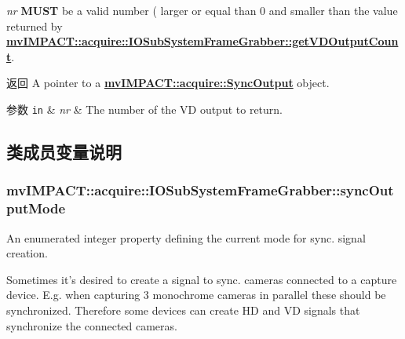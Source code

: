 {\itshape nr} {\bfseries M\+U\+S\+T} be a valid number ( larger or equal than 0 and smaller than the value returned by {\bfseries \hyperlink{classmv_i_m_p_a_c_t_1_1acquire_1_1_i_o_sub_system_frame_grabber_ac04032b336c489792fb1cc669bac3c27}{mv\+I\+M\+P\+A\+C\+T\+::acquire\+::\+I\+O\+Sub\+System\+Frame\+Grabber\+::get\+V\+D\+Output\+Count}}.

\begin{DoxyReturn}{返回}
A pointer to a {\bfseries \hyperlink{classmv_i_m_p_a_c_t_1_1acquire_1_1_sync_output}{mv\+I\+M\+P\+A\+C\+T\+::acquire\+::\+Sync\+Output}} object. 
\end{DoxyReturn}

\begin{DoxyParams}[1]{参数}
\mbox{\tt in}  & {\em nr} & The number of the V\+D output to return. \\
\hline
\end{DoxyParams}


\subsection{类成员变量说明}
\hypertarget{classmv_i_m_p_a_c_t_1_1acquire_1_1_i_o_sub_system_frame_grabber_a0e54ebc0c4382de40b6367bd7ac30288}{
\subsubsection[{sync\+Output\+Mode}]{ mv\+I\+M\+P\+A\+C\+T\+::acquire\+::\+I\+O\+Sub\+System\+Frame\+Grabber\+::sync\+Output\+Mode}}\label{classmv_i_m_p_a_c_t_1_1acquire_1_1_i_o_sub_system_frame_grabber_a0e54ebc0c4382de40b6367bd7ac30288}


An enumerated integer property defining the current mode for sync. signal creation. 

Sometimes it's desired to create a signal to sync. cameras connected to a capture device. E.\+g. when capturing 3 monochrome cameras in parallel these should be synchronized. Therefore some devices can create H\+D and V\+D signals that synchronize the connected cameras.

